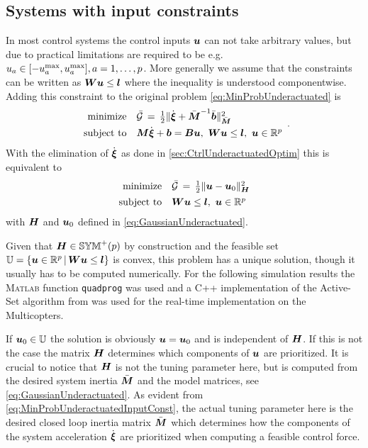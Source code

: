 \subsection{Systems with input constraints}
In most control systems the control inputs $\sysInput$ can not take arbitrary values, but due to practical limitations are required to be e.g. $\sysInputCoeff{a} \in [-\sysInputCoeff{a}^{\idxMax}, \sysInputCoeff{a}^{\idxMax}], a=1,\ldots,\numInputs$.
More generally we assume that the constraints can be written as $\sysInputConstMat \sysInput \leq \sysInputConstVec$ where the inequality is understood componentwise.
Adding this constraint to the original problem \eqref{eq:MinProbUnderactuated} is
\begin{align}\label{eq:MinProbUnderactuatedInputConst}
 \begin{array}{rl}
  \text{minimize} & \GaussianConstraintC \, = \, \tfrac{1}{2} \norm[\sysInertiaMatC]{\sysVeld + \sysInertiaMatC^{-1} \sysForceC}^2
  \\[1ex]
  \text{subject to} & \sysInertiaMat \sysVeld + \sysForce = \sysInputMat \sysInput, \ \sysInputConstMat \sysInput \leq \sysInputConstVec, \ \sysInput \in \RealNum^\numInputs 
 \end{array}
 .
\end{align}
With the elimination of $\sysVeld$ as done in \autoref{sec:CtrlUnderactuatedOptim} this is equivalent to
\begin{align}\label{eq:MinProbInputConstraints}
 \begin{array}{rl}
  \text{minimize} & \GaussianConstraintC \, = \, \tfrac{1}{2} \norm[\mat{H}]{\sysInput - \sysInput_0}^2 %
  \\[1ex]
  \text{subject to} &\sysInputConstMat \sysInput \leq \sysInputConstVec, \ \sysInput \in \RealNum^\numInputs 
 \end{array}
\end{align}
with $\mat{H}$ and $\sysInput_0$ defined in \eqref{eq:GaussianUnderactuated}.

Given that $\mat{H} \in \SymMatP(\numInputs)$ by construction and the feasible set $\mathbb{U} = \{ \sysInput \in \RealNum^\numInputs \, | \, \sysInputConstMat \sysInput \leq \sysInputConstVec \}$ is convex, this problem has a unique solution, though it usually has to be computed numerically.
For the following simulation results the \textsc{Matlab} function \texttt{quadprog} was used and a C++ implementation of the Active-Set algorithm from \cite[Algorithm 16.3]{Nocedal:NumericalOptimization} was used for the real-time implementation on the Multicopters.

If $\sysInput_0 \in \mathbb{U}$ the solution is obviously $\sysInput = \sysInput_0$ and is independent of $\mat{H}$.
If this is not the case the matrix $\mat{H}$ determines which components of $\sysInput$ are prioritized.
It is crucial to notice that $\mat{H}$ is not the tuning parameter here, but is computed from the desired system inertia $\sysInertiaMatC$ and the model matrices, see \eqref{eq:GaussianUnderactuated}.
As evident from \eqref{eq:MinProbUnderactuatedInputConst}, the actual tuning parameter here is the desired closed loop inertia matrix $\sysInertiaMatC$ which determines how the components of the system acceleration $\sysVeld$ are prioritized when computing a feasible control force.

